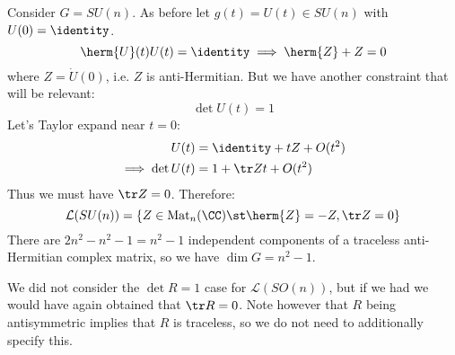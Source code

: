 \documentclass{jknotes}
\begin{document}
\begin{eg}
    Consider \(G=SU(n)\). As before let \(g(t)=U(t)\in SU(n)\) with \(U(0)=\identity\).
    \begin{equation}
        \herm{U}(t)U(t)=\identity \implies \herm{Z}+Z=0
    \end{equation}
    where \(Z=\dot{U}(0)\), i.e. \(Z\) is anti-Hermitian. But we have another constraint that will be relevant:
    \begin{equation}
        \det U(t) = 1
    \end{equation}
    Let's Taylor expand near \(t=0\):
    \begin{align}
        U(t) &= \identity + tZ + O(t^2) \\
        \implies \det U(t) &= 1 + \tr Z t + O(t^2)
    \end{align}
    Thus we must have \(\tr Z = 0\). Therefore:
    \begin{equation}
        \mathcal{L}(SU(n)) = \{Z \in \operatorname{Mat}_n(\CC) \st \herm{Z}=-Z, \tr Z = 0\}
    \end{equation}
    There are \(2n^2-n^2 - 1 = n^2-1\) independent components of a traceless anti-Hermitian complex matrix, so we have \(\dim G = n^2 - 1\).
\end{eg}
We did not consider the \(\det R = 1\) case for \(\mathcal{L}(SO(n))\), but if we had we would have again obtained that \(\tr R = 0\). Note however that \(R\) being antisymmetric implies that \(R\) is traceless, so we do not need to additionally specify this.
\end{document}
